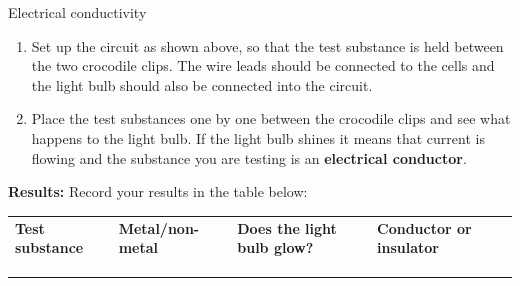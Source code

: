 \begin{i_experiment}{Electrical conductivity}
{        \newline
      \label{m38706*id66260}\begin{enumerate}[noitemsep, label=\textbf{\arabic*}. ] 
            \label{m38706*uid100}\item Set up the circuit as shown above, so that the test substance is held between the two crocodile clips. The wire leads should be connected to the cells and the light bulb should also be connected into the circuit.
\label{m38706*uid101}\item Place the test substances one by one between the crocodile clips and see what happens to the light bulb. If the light bulb shines it means that current is flowing and the substance you are testing is an \textbf{electrical conductor}.
\end{enumerate}
        \par 
      \label{m38706*id66291}\noindent{}\textbf{Results:}
        \newline
      Record your results in the table below:
          \begin{table}[H]
        \begin{center}
      \label{m38706*id66304}
    \noindent
      \tablelasttail{}
      \begin{xtabular}[t]{|l|l|l|l|}\hline
                \textbf{Test substance}
               &
                \textbf{Metal/non-metal}
               &
                \textbf{Does the light bulb glow?}
               &
                \textbf{Conductor or insulator}
     \tabularnewline{}
         &
         &
         &
     \tabularnewline{}
         &
         &
         &
     \tabularnewline{}
         &
         &
         &

\end{xtabular}
\end{center}
\end{table}}
\end{i_experiment}
